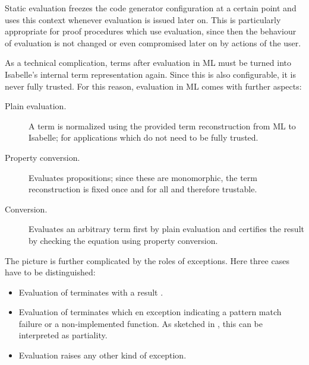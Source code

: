 \begin{isabellebody}
\begin{isamarkuptext}
  Static evaluation freezes the code generator configuration at a
  certain point and uses this context whenever evaluation is issued
  later on.  This is particularly appropriate for proof procedures
  which use evaluation, since then the behaviour of evaluation is not
  changed or even compromised later on by actions of the user.

  As a technical complication, terms after evaluation in ML must be
  turned into Isabelle's internal term representation again.  Since
  this is also configurable, it is never fully trusted.  For this
  reason, evaluation in ML comes with further aspects:

  \begin{description}

    \item[Plain evaluation.]  A term is normalized using the provided
      term reconstruction from ML to Isabelle; for applications which
      do not need to be fully trusted.

    \item[Property conversion.]  Evaluates propositions; since these
      are monomorphic, the term reconstruction is fixed once and for all
      and therefore trustable.

    \item[Conversion.]  Evaluates an arbitrary term  first
      by plain evaluation and certifies the result  by
      checking the equation  using property
      conversion.

  \end{description}

  \noindent The picture is further complicated by the roles of
  exceptions.  Here three cases have to be distinguished:

  \begin{itemize}

    \item Evaluation of  terminates with a result .

    \item Evaluation of  terminates which en exception
      indicating a pattern match failure or a non-implemented
      function.  As sketched in , this can be
      interpreted as partiality.
     
    \item Evaluation raises any other kind of exception.
     

\end{itemize}
\end{isamarkuptext}
\end{isabellebody}
